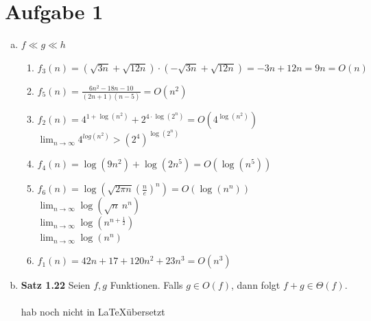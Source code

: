 \documentclass[a4paper,12pt]{scrartcl}
\begin{document}
\section*{Aufgabe 1}
\begin{enumerate}[a)]
	\item $f \ll g \ll h$ %
	\begin{enumerate}[1.]
		\item $f_3(n) = \left(\sqrt{3n} + \sqrt{12n}\right) \cdot \left(-\sqrt{3n} + \sqrt{12n}\right) = -3n + 12n = 9n = O(n)$
		\item $f_5(n) = \frac{6n^2-18n-10}{(2n+1)(n-5)} = O(n^2)$

		\item $f_2(n) = 4^{1 + \log(n^2)} + 2^{4 \cdot \log(2^n)} = O(4^{\log(n^2)})$\\
			  $\lim_{n \to \infty}4^{log(n^2)} > (2^4)^{\log(2^n)}$
		
		\item $f_4(n) = \log(9n^2) + \log(2n^5) = O(\log(n^5))$
		\item $f_6(n) = \log\left(\sqrt{2 \pi n}\left(\frac{n}{e}\right)^{\!n}\right) = O(\log(n^n))$\\
		$\lim_{n \to \infty}\log(\sqrt{n}\ n^n)$\\
		$\lim_{n \to \infty}\log(n^{n+\frac{1}{2}})$\\
		$\lim_{n \to \infty}\log(n^n)$
		
		\item $f_1(n) = 42n + 17 + 120n^2 + 23n^3 = O(n^3)$

			  
	\end{enumerate}

	\item{
		\textbf{Satz 1.22} Seien $f, g$ Funktionen. Falls $g \in O(f)$, dann folgt $f + g \in \Theta(f)$.\\
		\\hab noch nicht in \LaTeX übersetzt
	} 
\end{enumerate}

\break
\end{document}
